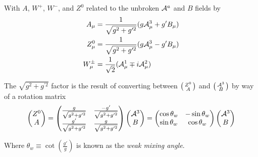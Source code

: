     With $A$, $W^+$, $W^-$, and $Z^0$ related to the unbroken $\mathcal{A}^a$ and $B$ fields by
    \begin{equation} \begin{split}
        A_{\mu} & = \frac{1}{\sqrt{g^2 + g^{\prime 2}}} ( g\mathcal{A}^3_{\mu} + g'B_{\mu} ) \\
        Z^0_{\mu} & = \frac{1}{\sqrt{g^2 + g^{\prime 2}}} ( g\mathcal{A}^3_{\mu} - g'B_{\mu} ) \\
        W^{\pm}_{\mu} & = \frac{1}{\sqrt{2}} (\mathcal{A}^1_{\mu} \mp i\mathcal{A}^2_{\mu})
    \end{split} \end{equation}

    The $\sqrt{g^2 + g^{\prime 2}}$ factor is the result of converting between
        $\big(\begin{smallmatrix} Z^0 \\ A \end{smallmatrix}\big)$ and $\big(\begin{smallmatrix} \mathcal{A}^3 \\ B \end{smallmatrix}\big)$ by way of a rotation matrix
    \begin{equation} \begin{split}
        \begin{pmatrix} Z^0 \\ A \end{pmatrix} =
        \begin{pmatrix}
            \frac{g}{\sqrt{g^2 + g^{\prime 2}}} & \frac{-g'}{\sqrt{g^2 + g^{\prime 2}}} \\
            \frac{g'}{\sqrt{g^2 + g^{\prime 2}}} & \frac{g}{\sqrt{g^2 + g^{\prime 2}}}
        \end{pmatrix} \begin{pmatrix} \mathcal{A}^3 \\ B \end{pmatrix} = 
        \begin{pmatrix}
            \cos\theta_w & -\sin\theta_w \\
            \sin\theta_w & \cos\theta_w
        \end{pmatrix} \begin{pmatrix} \mathcal{A}^3 \\ B \end{pmatrix}
    \end{split} \end{equation}

    Where $\theta_w \equiv \cot(\frac{g'}{g})$ is known as the \textit{weak mixing angle}.

